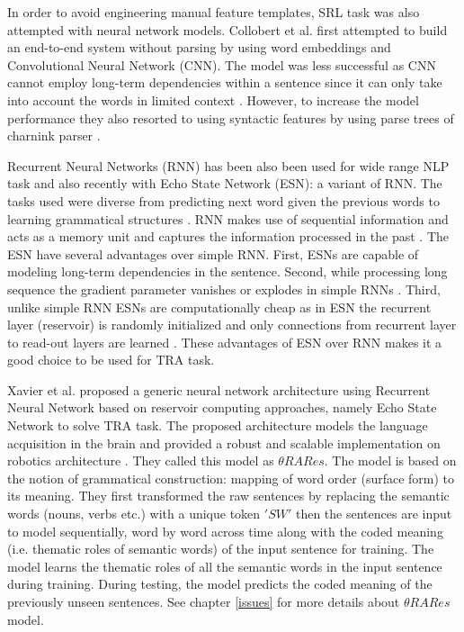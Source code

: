 In order to avoid engineering manual feature templates, SRL task was also attempted with neural network models. Collobert et al. \cite{srl:collobert:2011} first attempted to build an end-to-end system without parsing by using word embeddings and Convolutional Neural Network (CNN). The model was less successful as CNN cannot employ long-term dependencies within a sentence since it can only take into account the words in limited context \cite{end-to-end}. However, to increase the model performance they also resorted to using syntactic features by using parse trees of charnink parser \cite{charniak_parser:2000}.

Recurrent Neural Networks (RNN) has been also been used for wide range NLP task and also recently with Echo State Network (ESN): a variant of RNN. The tasks used were diverse from predicting next word given the previous words to learning grammatical structures \cite{esn:learn_gs}.  RNN makes use of sequential information and acts as a memory unit and captures the information processed in the past \cite{rnn:elman:1990}. The ESN have several advantages over simple RNN. First, ESNs are capable of modeling long-term dependencies in the sentence. Second, while processing long sequence the gradient parameter vanishes or explodes in simple RNNs \cite{rnn:gradiant_problem:bengio}. Third, unlike simple RNN ESNs are computationally cheap as in ESN the recurrent layer (reservoir) is randomly initialized and only connections from recurrent layer to read-out layers are learned \cite{esn:NIPS:2003, esn:practical_guide}. These advantages of ESN over RNN makes it a good choice to be used for TRA task.

Xavier et al. \cite{xavier:2013:RT} proposed a generic neural network architecture using Recurrent Neural Network based on reservoir computing approaches, namely Echo State Network to solve TRA task. The proposed architecture models the language acquisition in the brain and provided a robust and scalable implementation on robotics architecture \cite{xavier:2013:RT,tra:xavier_hri}. They called this model as $\theta RARes$. The model is based on the notion of grammatical construction: mapping of word order (surface form) to its meaning. They first transformed the raw sentences by replacing the semantic words (nouns, verbs etc.) with a unique token $'SW'$ then the sentences are input to model sequentially, word by word across time along with the coded meaning (i.e. thematic roles of semantic words) of the input sentence for training. The model learns the thematic roles of all the semantic words in the input sentence during training. During testing, the model predicts the coded meaning of the previously unseen sentences. See chapter \ref{issues} for more details about $\theta RARes$ model.

